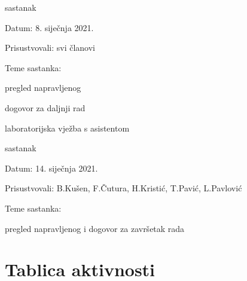 \begin{packed_enum}
					\item  sastanak
		\item[] \begin{packed_item}
			\item Datum: 8. siječnja 2021.
			\item Prisustvovali: svi članovi
			\item Teme sastanka:
			\begin{packed_item}
				\item  pregled napravljenog
				\item  dogovor za daljnji rad
				\item  laboratorijska vježba s asistentom
			\end{packed_item}
		\end{packed_item}
	
		\item  sastanak
		\item[] \begin{packed_item}
			\item Datum: 14. siječnja 2021.
			\item Prisustvovali: B.Kušen, F.Čutura, H.Kristić, T.Pavić, L.Pavlović
			\item Teme sastanka:
			\begin{packed_item}
				\item  pregled napravljenog i dogovor za završetak rada
			\end{packed_item}
		\end{packed_item}

					
		\end{packed_enum}
		
		\eject
		\section*{Tablica aktivnosti}
					
